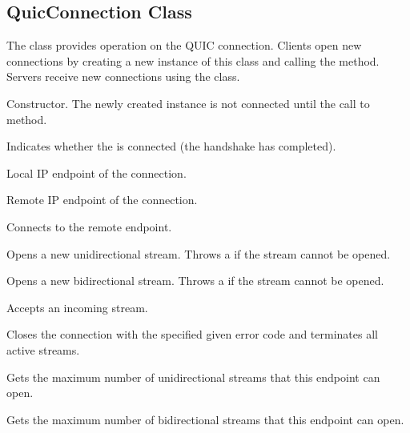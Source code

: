 \subsection{QuicConnection Class}

The \QuicConnection{} class provides operation on the QUIC connection. Clients open new
connections by creating a new instance of this class and calling the  method.
Servers receive new connections using the  class.

\begin{description}

     Constructor. The newly created instance is not connected until the call to  method.

     Indicates whether the \QuicConnection{} is connected (the handshake has completed).

     Local IP endpoint of the connection.

     Remote IP endpoint of the connection.

     Connects to the remote endpoint.

     Opens a new unidirectional stream. Throws a  if the stream cannot be opened.

     Opens a new bidirectional stream. Throws a  if the stream cannot be opened.

     Accepts an incoming stream.

     Closes the connection with the specified given error code and terminates all active streams.

     Gets the maximum number of unidirectional streams that this endpoint can open.

     Gets the maximum number of bidirectional streams that this endpoint can open.

\end{description}


